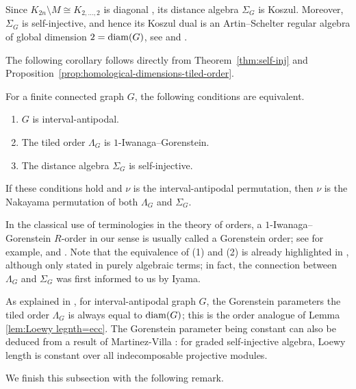 \documentclass[a4paper,leqno]{amsart}
\begin{document}
\begin{rmk}
Since $K_{2n}\setminus M\cong K_{2,\ldots,2}$ is diagonal
\cite[Example~7.6]{HW17}, its distance algebra
\(\Sigma_G\) is Koszul. Moreover, $\Sigma_G$ is self-injective, and
hence its Koszul dual is an Artin--Schelter regular algebra of global dimension $2=\operatorname{diam}(G)$, see \cite[Proposition~5.10]{Smi96} and \cite{MV99}.
\end{rmk}

The following corollary follows directly from Theorem~\ref{thm:self-inj} and Proposition~\ref{prop:homological-dimensions-tiled-order}.

\begin{cor} 
\label{thm:tiled-gorenstein-antipodal}
For a finite connected graph $G$, the following conditions are
equivalent.
\begin{enumerate}
    \item $G$ is interval-antipodal.
    \item The tiled order $\Lambda_G$ is \(1\)-Iwanaga--Gorenstein.
    \item The distance algebra $\Sigma_G$ is self-injective.
\end{enumerate}
If these conditions hold and $\nu$ is the interval-antipodal
permutation, then $\nu$ is the Nakayama permutation of both
$\Lambda_G$ and $\Sigma_G$.
\end{cor}
\begin{rmk}
    In the classical use of terminologies in the theory of orders, a \(1\)-Iwanaga--Gorenstein $R$-order in our sense is usually called a Gorenstein order; see for example, \cite[Definition 6.1]{DKR67} and \cite[Section~2]{Rog73}.
    Note that the equivalence of (1) and (2) is already highlighted in \cite[Section~2.3]{IL26}, although only  stated in purely algebraic terms; in fact, the connection between $\Lambda_G$ and $\Sigma_G$ was first informed to us by Iyama.
\end{rmk}
\begin{rmk}
As explained in \cite{IL26}, for interval-antipodal graph $G$, the Gorenstein parameters the tiled order $\Lambda_G$ is always equal to $\operatorname{diam}(G)$; this is the order analogue of Lemma \ref{lem:Loewy legnth=ecc}.  The Gorenstein parameter being constant can also be deduced from a result of Martinez-Villa \cite[Theorem 3.3]{MV99}: for graded self-injective algebra, Loewy length is constant over all indecomposable projective modules.
\end{rmk}

We finish this subsection with the following remark.
\end{document}
